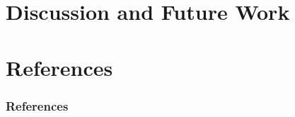 \documentclass[
    pdf,
    11pt,
    xcolor={svgnames},
  ]{beamer}
\begin{document}
\section{Discussion and Future Work}


\section{References}
\begin{frame}[allowframebreaks]
  \frametitle{References}
  
  
\end{frame}
\end{document}
